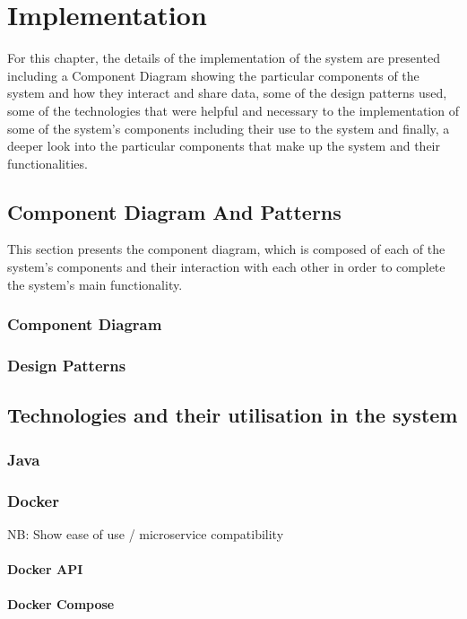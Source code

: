 \chapter{Implementation}\label{ch:conclusions}
For this chapter, the details of the implementation of the system are presented including a Component Diagram showing the particular components of the system and how they interact and share data, some of the design patterns used, some of the technologies that were helpful and necessary to the implementation of some of the system's components including their use to the system and finally, a deeper look into the particular components that make up the system and their functionalities.

\section{Component Diagram And Patterns}
This section presents the component diagram, which is composed of each of the system's components and their interaction with each other in order to complete the system's main functionality.
\subsection{Component Diagram}
\subsection{Design Patterns}

\section{Technologies and their utilisation in the system}
\subsection{Java}
\subsection{Docker}
NB: Show ease of use / microservice compatibility
\subsubsection{Docker API}
\subsubsection{Docker Compose}

